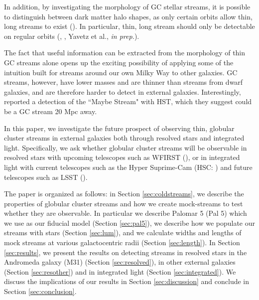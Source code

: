 \documentclass[twocolumn]{aastex62}
\begin{document}
In addition, by investigating the morphology of GC stellar streams, it is  possible to distinguish between dark matter halo shapes, as only certain orbits allow thin, long streams to exist (\citealt{pearson15}). In particular, thin, long stream should only be detectable on regular orbits (\citealt{pearson15}, \citealt{price16}, Yavetz et al., {\it in prep.}).

The fact that useful information can be extracted from the morphology of thin GC streams alone opens up the exciting possibility of applying some of the intuition built for streams around our own Milky Way to other galaxies.  GC streams, however, have lower masses and are thinner than streams from dwarf galaxies, and are therefore harder to detect in external galaxies. Interestingly, \citet{abraham18} reported a detection of the ``Maybe Stream" with HST, which they suggest could be a GC stream 20 Mpc away. 


In this paper, we investigate the future prospect of observing thin, globular cluster streams in external galaxies both through resolved stars and integrated light. 
Specifically, we ask whether globular cluster streams will be observable in resolved stars with upcoming telescopes such as WFIRST (\citealt{spergel13}), or in integrated light with current telescopes such as the Hyper Suprime-Cam (HSC: \citealt{miyazaki12}) and future telescopes such as LSST (\citealt{ivezi08}). %

The paper is organized as follows: in Section \ref{sec:coldstreams}, we describe the properties of globular cluster streams and how we create mock-streams to test whether they are observable. In particular we describe Palomar 5 (Pal 5) which we use as our fiducial model (Section \ref{sec:pal5}), we describe how we populate our streams with stars (Section \ref{sec:lum}), and we calculate widths and lengths of mock streams at various galactocentric radii (Section \ref{sec:length}). In Section \ref{sec:results}, we present the results on detecting streams in resolved stars in the Andromeda galaxy (M31) (Section \ref{sec:resolved}), in other external galaxies (Section \ref{sec:resother}) and in integrated light (Section \ref{sec:integrated}). We discuss the implications of our results in Section \ref{sec:discussion} and conclude in Section \ref{sec:conclusion}.
%
\end{document}
